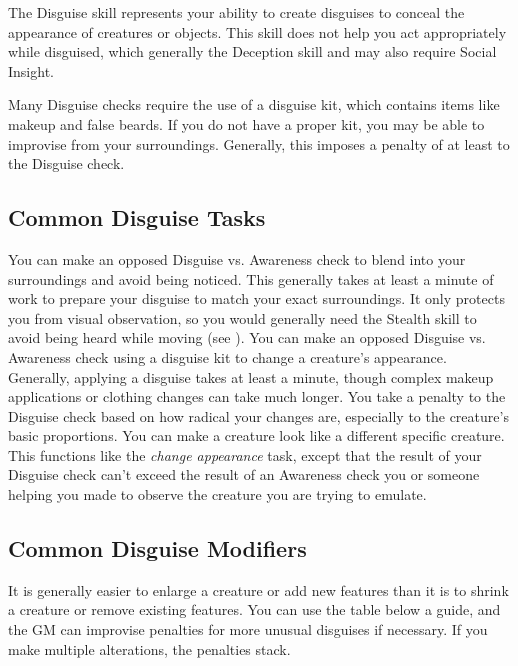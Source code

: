 \newpage
{}
  The Disguise skill represents your ability to create disguises to conceal the appearance of creatures or objects.
  This skill does not help you act appropriately while disguised, which generally the Deception skill and may also require Social Insight.

  Many Disguise checks require the use of a disguise kit, which contains items like makeup and false beards.
  If you do not have a proper kit, you may be able to improvise from your surroundings.
  Generally, this imposes a penalty of at least  to the Disguise check.

  \subsection{Common Disguise Tasks}
     You can make an opposed Disguise vs. Awareness check to blend into your surroundings and avoid being noticed.
    This generally takes at least a minute of work to prepare your disguise to match your exact surroundings.
    It only protects you from visual observation, so you would generally need the Stealth skill to avoid being heard while moving (see ).
    You can make an opposed Disguise vs. Awareness check using a disguise kit to change a creature's appearance.
    Generally, applying a disguise takes at least a minute, though complex makeup applications or clothing changes can take much longer.
    You take a penalty to the Disguise check based on how radical your changes are, especially to the creature's basic proportions.
     You can make a creature look like a different specific creature.
    This functions like the \textit{change appearance} task, except that the result of your Disguise check can't exceed the result of an Awareness check you or someone helping you made to observe the creature you are trying to emulate.

  \subsection{Common Disguise Modifiers}
    It is generally easier to enlarge a creature or add new features than it is to shrink a creature or remove existing features.
    You can use the table below a guide, and the GM can improvise penalties for more unusual disguises if necessary.
    If you make multiple alterations, the penalties stack.

